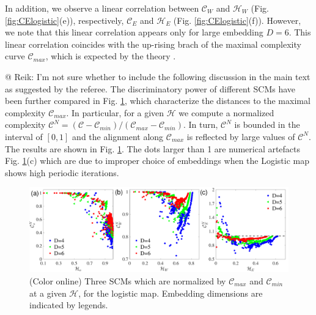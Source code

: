 \documentclass[aip,cha,reprint,nofootinbib]{revtex4-1}
\begin{document}
{\color{red}In addition, we observe a linear correlation between $\mathcal{C}_W$ and $\mathcal{H}_{W}$ (Fig. \ref{fig:CElogistic}(e)), respectively, $\mathcal{C}_{E}$ and $\mathcal{H}_{E}$ (Fig. \ref{fig:CElogistic}(f)). However, we note that this linear correlation appears only for large embedding $D = 6$. This linear correlation coincides with the up-rising brach of the maximal complexity curve $\mathcal{C}_{max}$, which is expected by the theory \cite{SMCbook2010}. }

{\color{red} @ Reik: I'm not sure whether to include the following discussion in the main text as suggested by the referee. The discriminatory power of different SCMs have been further compared in Fig. \ref{fig:CHlogCmax}, which characterize the distances to the maximal complexity $\mathcal{C}_{max}$. In particular, for a given $\mathcal{H}$ we compute a normalized complexity $\mathcal{C}^{N} = (\mathcal{C} - \mathcal{C}_{min}) / (\mathcal{C}_{max} - \mathcal{C}_{min})$. In turn, $\mathcal{C}^{N}$ is bounded in the interval of $[0, 1]$ and the alignment along $\mathcal{C}_{max}$ is reflected by large values of $\mathcal{C}^{N}$. The results are shown in Fig. \ref{fig:CHlogCmax}. The dots larger than 1 are numerical artefacts Fig. \ref{fig:CHlogCmax}(c) which are due to  improper choice of embeddings when the Logistic map shows high periodic iterations.    
\begin{figure}
        \centering
        \includegraphics[width=2\columnwidth]{CompEntropyCNormalized_Logistic.pdf}
\caption{(Color online) Three SCMs which are normalized by $\mathcal{C}_{max}$ and $\mathcal{C}_{min}$  at a given $\mathcal{H}$, for the logistic map. Embedding dimensions are indicated by legends.  \label{fig:CHlogCmax}}
\end{figure}
}
\end{document}
